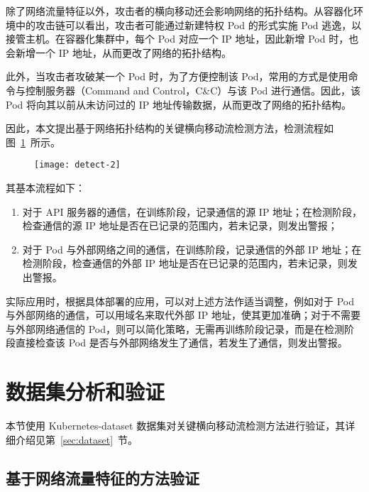{除了网络流量特征以外，攻击者的横向移动还会影响网络的拓扑结构。从容器化环境中的攻击链可以看出，攻击者可能通过新建特权 Pod 的形式实施 Pod 逃逸，以接管主机。在容器化集群中，每个 Pod 对应一个 IP 地址，因此新增 Pod 时，也会新增一个 IP 地址，从而更改了网络的拓扑结构。

此外，当攻击者攻破某一个 Pod 时，为了方便控制该 Pod，常用的方式是使用命令与控制服务器（Command and Control，C\&C）与该 Pod 进行通信。因此，该 Pod 将向其以前从未访问过的 IP 地址传输数据，从而更改了网络的拓扑结构。

因此，本文提出基于网络拓扑结构的关键横向移动流检测方法，检测流程如图~\ref{fig:detect-2}~所示。

\begin{figure}[!htbp]
    \centering
    \texttt{[image: detect-2]}
    \label{fig:detect-2}

\end{figure}

其基本流程如下：

\begin{enumerate}
    \item 对于 API 服务器的通信，在训练阶段，记录通信的源 IP 地址；在检测阶段，检查通信的源 IP 地址是否在已记录的范围内，若未记录，则发出警报；
    \item 对于 Pod 与外部网络之间的通信，在训练阶段，记录通信的外部 IP 地址；在检测阶段，检查通信的外部 IP 地址是否在已记录的范围内，若未记录，则发出警报。
\end{enumerate}

实际应用时，根据具体部署的应用，可以对上述方法作适当调整，例如对于 Pod 与外部网络的通信，可以用域名来取代外部 IP 地址，使其更加准确；对于不需要与外部网络通信的 Pod，则可以简化策略，无需再训练阶段记录，而是在检测阶段直接检查该 Pod 是否与外部网络发生了通信，若发生了通信，则发出警报。

\section{数据集分析和验证}

本节使用 Kubernetes-dataset 数据集对关键横向移动流检测方法进行验证，其详细介绍见第~\ref{sec:dataset}~节。

\subsection{基于网络流量特征的方法验证}

}
